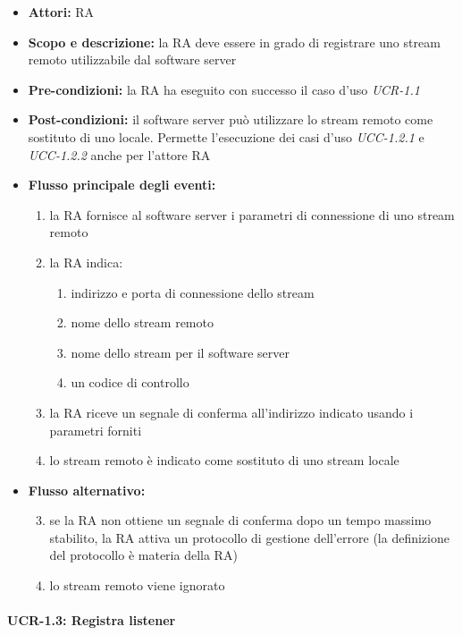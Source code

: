 \begin{itemize}
	\item \textbf{Attori:} RA
	\item \textbf{Scopo e descrizione:} la RA deve essere in grado di registrare uno stream remoto utilizzabile dal software server 
	\item \textbf{Pre-condizioni:} la RA ha eseguito con successo il caso d'uso \emph{UCR-1.1}
	\item \textbf{Post-condizioni:} il software server può utilizzare lo stream remoto come sostituto di uno locale. Permette l'esecuzione dei casi d'uso \emph{UCC-1.2.1} e \emph{UCC-1.2.2} anche per l'attore RA
	\item \textbf{Flusso principale degli eventi:}
		\begin{enumerate}
			\item la RA fornisce al software server i parametri di connessione di uno stream remoto
			\item la RA indica:
				\begin{enumerate}
					\item indirizzo e porta di connessione dello stream
					\item nome dello stream remoto
					\item nome dello stream per il software server
					\item un codice di controllo
				\end{enumerate}
			\item la RA riceve un segnale di conferma all'indirizzo indicato usando i parametri forniti
			\item lo stream remoto è indicato come sostituto di uno stream locale
		\end{enumerate}
	\item \textbf{Flusso alternativo:}
		\begin{enumerate}
			\setcounter{enumi}{2}
			\item se la RA non ottiene un segnale di conferma dopo un tempo massimo stabilito, la RA attiva un protocollo di gestione dell'errore (la definizione del protocollo è materia della RA)
			\item lo stream remoto viene ignorato
		\end{enumerate}
\end{itemize}


\paragraph{UCR-1.3: Registra listener}

